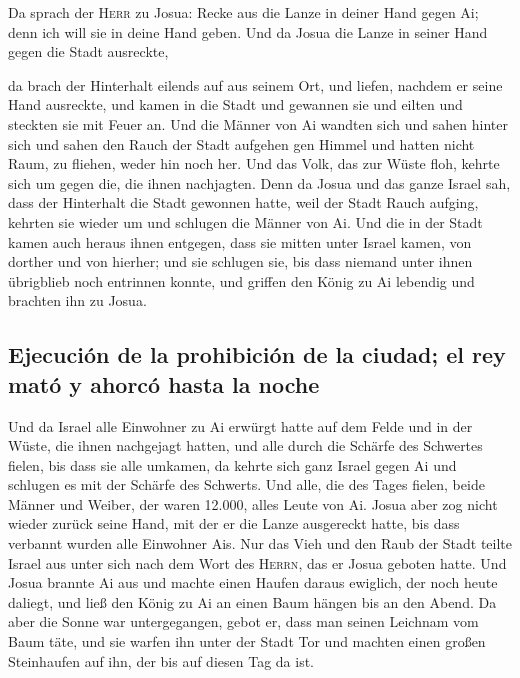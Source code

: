  Da sprach der \textsc{Herr} zu Josua: Recke aus die
Lanze in deiner Hand gegen Ai; denn ich will sie in deine Hand geben.
Und da Josua die Lanze in seiner Hand gegen die Stadt ausreckte,

 da brach der Hinterhalt eilends auf aus seinem Ort, und
liefen, nachdem er seine Hand ausreckte, und kamen in die Stadt und
gewannen sie und eilten und steckten sie mit Feuer an. 
Und die Männer von Ai wandten sich und sahen hinter sich und sahen den
Rauch der Stadt aufgehen gen Himmel und hatten nicht Raum, zu fliehen,
weder hin noch her. Und das Volk, das zur Wüste floh, kehrte sich um
gegen die, die ihnen nachjagten.  Denn da Josua und das
ganze Israel sah, dass der Hinterhalt die Stadt gewonnen hatte, weil der
Stadt Rauch aufging, kehrten sie wieder um und schlugen die Männer von
Ai.  Und die in der Stadt kamen auch heraus ihnen
entgegen, dass sie mitten unter Israel kamen, von dorther und von
hierher; und sie schlugen sie, bis dass niemand unter ihnen übrigblieb
noch entrinnen konnte,  und griffen den König zu Ai
lebendig und brachten ihn zu Josua.

\hypertarget{ejecuciuxf3n-de-la-prohibiciuxf3n-de-la-ciudad-el-rey-matuxf3-y-ahorcuxf3-hasta-la-noche}{%
\subsection{Ejecución de la prohibición de la ciudad; el rey mató y
ahorcó hasta la
noche}\label{ejecuciuxf3n-de-la-prohibiciuxf3n-de-la-ciudad-el-rey-matuxf3-y-ahorcuxf3-hasta-la-noche}}

 Und da Israel alle Einwohner zu Ai erwürgt hatte auf dem
Felde und in der Wüste, die ihnen nachgejagt hatten, und alle durch die
Schärfe des Schwertes fielen, bis dass sie alle umkamen, da kehrte sich
ganz Israel gegen Ai und schlugen es mit der Schärfe des Schwerts.
 Und alle, die des Tages fielen, beide Männer und Weiber,
der waren 12.000, alles Leute von Ai.  Josua aber zog
nicht wieder zurück seine Hand, mit der er die Lanze ausgereckt hatte,
bis dass verbannt wurden alle Einwohner Ais.  Nur das
Vieh und den Raub der Stadt teilte Israel aus unter sich nach dem Wort
des \textsc{Herrn}, das er Josua geboten hatte.  Und
Josua brannte Ai aus und machte einen Haufen daraus ewiglich, der noch
heute daliegt,  und ließ den König zu Ai an einen Baum
hängen bis an den Abend. Da aber die Sonne war untergegangen, gebot er,
dass man seinen Leichnam vom Baum täte, und sie warfen ihn unter der
Stadt Tor und machten einen großen Steinhaufen auf ihn, der bis auf
diesen Tag da ist.

